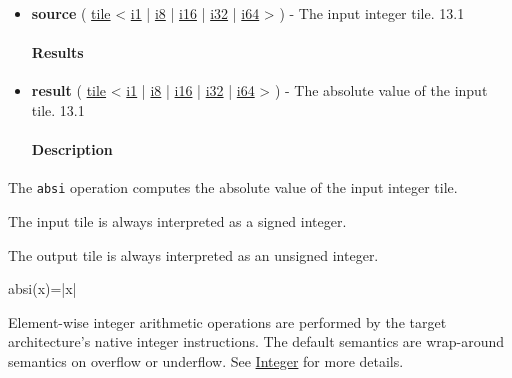 \documentclass{article}
\begin{document}
\begin{itemize}
\item \textbf{source} ( \href{https://docs.nvidia.com/cuda/tile-ir/latest/sections/types.html#type-tile}{tile} < \href{https://docs.nvidia.com/cuda/tile-ir/latest/sections/types.html#subsection-element-types}{i1} | \href{https://docs.nvidia.com/cuda/tile-ir/latest/sections/types.html#subsection-element-types}{i8} | \href{https://docs.nvidia.com/cuda/tile-ir/latest/sections/types.html#subsection-element-types}{i16} | \href{https://docs.nvidia.com/cuda/tile-ir/latest/sections/types.html#subsection-element-types}{i32} | \href{https://docs.nvidia.com/cuda/tile-ir/latest/sections/types.html#subsection-element-types}{i64} > ) - The input integer tile. 13.1


\paragraph{Results}

\item \textbf{result} ( \href{https://docs.nvidia.com/cuda/tile-ir/latest/sections/types.html#type-tile}{tile} < \href{https://docs.nvidia.com/cuda/tile-ir/latest/sections/types.html#subsection-element-types}{i1} | \href{https://docs.nvidia.com/cuda/tile-ir/latest/sections/types.html#subsection-element-types}{i8} | \href{https://docs.nvidia.com/cuda/tile-ir/latest/sections/types.html#subsection-element-types}{i16} | \href{https://docs.nvidia.com/cuda/tile-ir/latest/sections/types.html#subsection-element-types}{i32} | \href{https://docs.nvidia.com/cuda/tile-ir/latest/sections/types.html#subsection-element-types}{i64} > ) - The absolute value of the input tile. 13.1


\paragraph{Description}

\end{itemize}
The \texttt{absi} operation computes the absolute value of the input integer tile.


The input tile is always interpreted as a signed integer.

The output tile is always interpreted as an unsigned integer.


absi(x)=|x|

Element-wise integer arithmetic operations are performed by the target architecture's native integer instructions. The default semantics are wrap-around semantics on overflow or underflow. See \href{https://docs.nvidia.com/cuda/tile-ir/latest/sections/operations.html#op-group-integer}{Integer} for more details.
\end{document}
